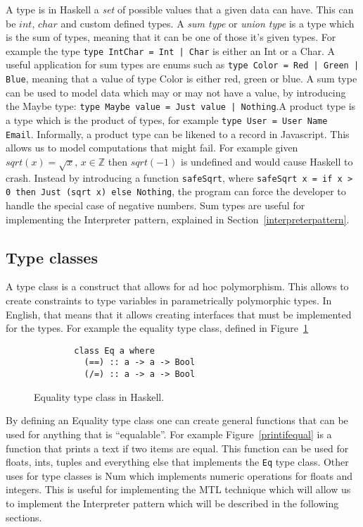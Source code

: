 A type is in Haskell a \textit{set} of possible values that a given data can
have. This can be $int$, $char$ and custom defined types. A \textit{sum type} or
\textit{union type} is a type which is the sum of types, meaning that it can be
one of those it's given types. For example the type \texttt{type IntChar = Int |
Char} is either an Int or a Char. A useful application for sum types are enums
such as \texttt{type Color = Red | Green | Blue}, meaning that a value of type
Color is either red, green or blue. A sum type can be used to model data which
may or may not have a value, by introducing the Maybe type: \texttt{type Maybe
value = Just value | Nothing}.A product type is a type which is the product of
types, for example \texttt{type User = User Name Email}.  Informally, a product
type can be likened to a record in Javascript.  This allows us to model
computations that might fail. For example given $sqrt(x) = \sqrt{x},\, x\in
\mathbb{Z}$ then $sqrt(-1)$ is undefined and would cause Haskell to crash.
Instead by introducing a function \texttt{safeSqrt}, where \texttt{safeSqrt x =
if x > 0 then Just (sqrt x) else Nothing}, the program can force the developer to
handle the special case of negative numbers. Sum types are useful for
implementing the Interpreter pattern, explained in
Section~\ref{interpreterpattern}.

\subsection{Type classes}\label{typeclass}

A type class is a construct that allows for ad hoc polymorphism. This allows to
create constraints to type variables in parametrically polymorphic types. In
English, that means that it allows creating interfaces that must be implemented
for the types. For example the equality type class, defined in
Figure~\ref{equalitytypeclass}

\begin{figure}[H]
    \begin{lstlisting}
        class Eq a where
          (==) :: a -> a -> Bool
          (/=) :: a -> a -> Bool
    \end{lstlisting}
    \caption{Equality type class in Haskell.}
    \label{equalitytypeclass}
\end{figure}

By defining an Equality type class one can create general functions that can be
used for anything that is ``equalable''. For example Figure~\ref{printifequal}
is a function that prints a text if two items are equal. This function can be
used for floats, ints, tuples and everything else that implements the
\texttt{Eq} type class. Other uses for type classes is Num which implements
numeric operations for floats and integers. This is useful for implementing the
MTL technique which will allow us to implement the Interpreter pattern which
will be described in the following sections.

